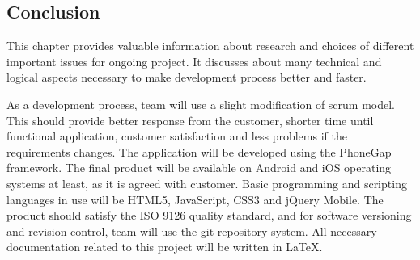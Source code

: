 \subsection{Conclusion}

This chapter provides valuable information about research and choices of different important issues for ongoing project. It discusses about many technical and logical aspects necessary to make development process better and faster.\newline

As a development process, team will use a slight modification of scrum model. This should provide better response from the customer, shorter time until functional application, customer satisfaction and less problems if the requirements changes. The application will be developed using the PhoneGap framework. The final product will be available on Android and iOS operating systems at least, as it is agreed with customer. Basic programming and scripting languages in use will be HTML5, JavaScript, CSS3 and jQuery Mobile. The product should satisfy the ISO 9126 quality standard, and for software versioning and revision control, team will use the git repository system. All necessary documentation related to this project will be written in LaTeX.
